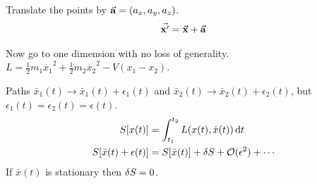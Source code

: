 \documentclass{article}
\begin{document}
Translate the points by $\va{a}=(a_x,a_y,a_z)$.
\begin{align*}
    \va{x'}=\va{x}+\va{a}
\end{align*}

Now go to one dimension with no loss of generality. $L=\frac{1}{2}m_1\dot{x_1}^2+\frac{1}{2}m_2\dot{x_2}^2-V(x_1-x_2)$.

Paths $\bar{x}_1(t)\to\bar{x}_1(t)+\epsilon_1(t)$ and  $\bar{x}_2(t)\to\bar{x}_2(t)+\epsilon_2(t)$, but $\epsilon_1(t)=\epsilon_2(t)=\epsilon(t)$.
\begin{align*}
    S[x(t)]                   & =\int_{t_1}^{t_2} L(x(t),\dot{x}(t))\dd{t}            \\
    S[\bar{x}(t)+\epsilon(t)] & =S[\bar{x}(t)]+\var{S}+\mathcal{O}(\epsilon^2)+\cdots
\end{align*}
If $\bar{x}(t)$ is stationary then $\var{S}=0$.
\end{document}
